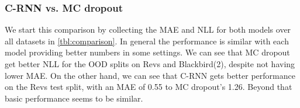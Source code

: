 \documentclass[../main.tex]{subfiles}
\begin{document}


\subsubsection{C-RNN vs. MC dropout}

We start this comparison by collecting the MAE and NLL for both models over all datasets in \cref{tbl:comparison}. In general the performance is similar with each model providing better numbers in some settings. We can see that MC dropout get better NLL for the OOD splits on Revs and Blackbird(2), despite not having lower MAE. On the other hand, we can see that C-RNN gets better performance on the Revs test split, with an MAE of 0.55 to MC dropout's 1.26. Beyond that basic performance seems to be similar. 


        
\end{document}
